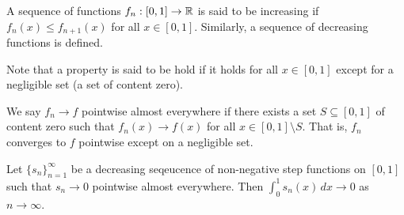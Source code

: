 \begin{definition}
    A sequence of functions $f_{n}:[0,1] \to \mathbb{R}$ is said to be increasing if $f_{n}(x) \leq f_{n+1}(x)$ for all $x \in [0,1]$. Similarly, a sequence of decreasing functions is defined.
\end{definition}

Note that a property is said to be hold  if it holds for all $x \in [0,1]$ except for a negligible set (a set of content zero).

\begin{definition}
    We say $f_{n} \to f$ pointwise almost everywhere if there exists a set $S \subseteq [0,1]$ of content zero such that $f_{n}(x) \to f(x)$ for all $x \in [0,1] \setminus S$. That is, $f_{n}$ converges to $f$ pointwise except on a negligible set.
\end{definition}

\begin{theorem}
    Let $\{s_{n}\}_{n=1}^{\infty}$ be a decreasing seqeucence of non-negative step functions on $[0,1]$ such that $s_{n} \to 0$ pointwise almost everywhere. Then $\int_{0}^{1} s_{n}(x) \, dx \to 0$ as $n \to \infty$.
\end{theorem}

